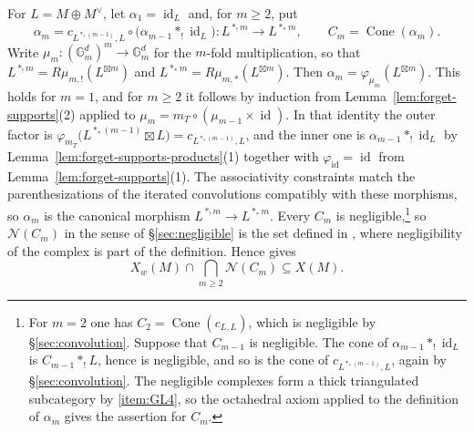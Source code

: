 \documentclass[12pt,reqno]{amsart}
\theoremstyle{definition}
\theoremstyle{plain}
\theoremstyle{definition}
\theoremstyle{remark}
\newcommand{\bbG}{\mathbb{G}}  \newcommand{\bbH}{\mathbb{H}}
\newcommand{\Gm}{\bbG_m}
\newcommand{\Cone}{\operatorname{Cone}}
\begin{document}
\begin{enumerate}[label=\textup{(T\arabic*)}, ref=\textup{(T\arabic*)}]
For \(L=M\oplus M^\vee\), let \(\alpha_1=\operatorname{id}_L\) and, for \(m\ge2\), put
\[
 \alpha_m
 =c_{L^{\ast_*(m-1)},L}\circ\bigl(\alpha_{m-1}\ast_!\operatorname{id}_L\bigr)
 \colon L^{\ast_!m}\longrightarrow L^{\ast_*m},
 \qquad
 C_m=\Cone(\alpha_m).
\]
Write \(\mu_m\colon(\Gm^d)^m\to\Gm^d\) for the \(m\)-fold multiplication, so that
\(L^{\ast_!m}=R\mu_{m,!}(L^{\boxtimes m})\) and \(L^{\ast_*m}=R\mu_{m,*}(L^{\boxtimes m})\).  Then
\(\alpha_m=\varphi_{\mu_m}(L^{\boxtimes m})\).  This holds for \(m=1\), and for \(m\ge2\) it follows by
induction from Lemma~\ref{lem:forget-supports}(2) applied to
\(\mu_m=m_T\circ(\mu_{m-1}\times\operatorname{id})\).  In that identity the outer factor is
\(\varphi_{m_T}\bigl(L^{\ast_*(m-1)}\boxtimes L\bigr)=c_{L^{\ast_*(m-1)},L}\), and the inner one is
\(\alpha_{m-1}\ast_!\operatorname{id}_L\) by Lemma~\ref{lem:forget-supports-products}(1) together with
\(\varphi_{\operatorname{id}}=\operatorname{id}\) from Lemma~\ref{lem:forget-supports}(1).  The
associativity constraints match the parenthesizations of the iterated convolutions compatibly with
these morphisms, so \(\alpha_m\) is the canonical morphism \(L^{\ast_!m}\to L^{\ast_*m}\).  Every
\(C_m\) is negligible,\footnote{For \(m=2\) one has \(C_2=\Cone(c_{L,L})\), which is negligible by
\S\ref{sec:convolution}.  Suppose that \(C_{m-1}\) is negligible.  The cone of
\(\alpha_{m-1}\ast_!\operatorname{id}_L\) is \(C_{m-1}\ast_!L\), hence is negligible, and so is the
cone of \(c_{L^{\ast_*(m-1)},L}\), again by \S\ref{sec:convolution}.  The negligible complexes form
a thick triangulated subcategory by \ref{item:GL4}, so the octahedral axiom applied to the
definition of \(\alpha_m\) gives the assertion for \(C_m\).} so \(\mathcal N(C_m)\) in the sense of
\S\ref{sec:negligible} is the set defined in \cite[\S3.4]{ForeyFresanKowalski2021}, where
negligibility of the complex is part of the definition.  Hence
\cite[Lem.~3.28]{ForeyFresanKowalski2021} gives
\[
        X_w(M)\cap\bigcap_{m\ge2}\mathcal N(C_m)\subseteq X(M).
\]


\end{enumerate}
\end{document}
